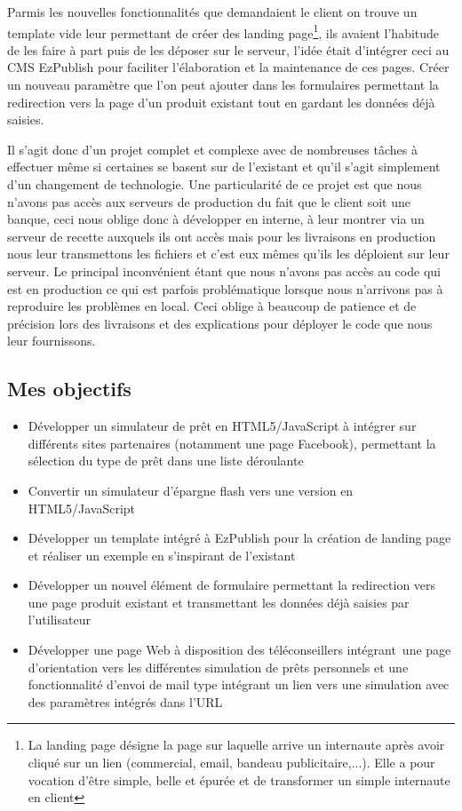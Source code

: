 \documentclass[a4paper,11pt,twoside]{report}
\begin{document}
    Parmis les nouvelles fonctionnalités que demandaient le client on trouve un template vide leur permettant de créer des landing page\footnote{La landing page désigne la page sur laquelle arrive un internaute après avoir cliqué sur un lien (commercial, email, bandeau publicitaire,...). Elle a pour vocation d'être simple, belle et épurée et de transformer un simple internaute en client}, ils avaient l'habitude de les faire à part puis de les déposer sur le serveur, l'idée était d'intégrer ceci au CMS EzPublish pour faciliter l'élaboration et la maintenance de ces pages. Créer un nouveau paramètre que l'on peut ajouter dans les formulaires permettant la redirection vers la page d'un produit existant tout en gardant les données déjà saisies. 
    
    Il s'agit donc d'un projet complet et complexe avec de nombreuses tâches à effectuer même si certaines se basent sur de l'existant et qu'il s'agit simplement d'un changement de technologie. Une particularité de ce projet est que nous n'avons pas accès aux serveurs de production du fait que le client soit une banque, ceci nous oblige donc à développer en interne, à leur montrer via un serveur de recette auxquels ils ont accès mais pour les livraisons en production nous leur transmettons les fichiers et c'est eux mêmes qu'ils les déploient sur leur serveur. Le principal inconvénient étant que nous n'avons pas accès au code qui est en production ce qui est parfois problématique lorsque nous n'arrivons pas à reproduire les problèmes en local. Ceci oblige à beaucoup de patience et de précision lors des livraisons et des explications pour déployer le code que nous leur fournissons.  
    \subsection*{Mes objectifs}
      \begin{itemize}

	\item Développer un simulateur de prêt en HTML5/JavaScript à intégrer sur différents sites partenaires (notamment une page Facebook), permettant la sélection du type de prêt dans une liste déroulante
	\item Convertir un simulateur d'épargne flash vers une version en HTML5/JavaScript 
	\item Développer un template intégré à EzPublish pour la création de landing page et réaliser un exemple en s'inspirant de l'existant
	\item Développer un nouvel élément de formulaire permettant la redirection vers une page produit existant et transmettant les données déjà saisies par l'utilisateur
 	\item Développer une page Web à disposition des téléconseillers intégrant une page d’orientation vers les différentes simulation de prêts personnels et une fonctionnalité d’envoi de mail type intégrant un lien vers une simulation avec des paramètres intégrés dans l’URL

      \end{itemize}
\end{document}

